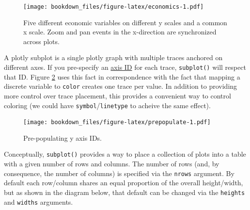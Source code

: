 \documentclass[12pt,]{isuthesis}
\newenvironment{Shaded}{\begin{snugshade}}{\end{snugshade}}
\newcommand{\KeywordTok}[1]{\textcolor[rgb]{0.13,0.29,0.53}{\textbf{{#1}}}}
\newcommand{\DataTypeTok}[1]{\textcolor[rgb]{0.13,0.29,0.53}{{#1}}}
\newcommand{\DecValTok}[1]{\textcolor[rgb]{0.00,0.00,0.81}{{#1}}}
\newcommand{\StringTok}[1]{\textcolor[rgb]{0.31,0.60,0.02}{{#1}}}
\newcommand{\OtherTok}[1]{\textcolor[rgb]{0.56,0.35,0.01}{{#1}}}
\newcommand{\NormalTok}[1]{{#1}}
\begin{document}
\begin{figure}[htbp]
\centering
\texttt{[image: bookdown\_files/figure-latex/economics-1.pdf]}
\caption{\label{fig:economics}Five different economic variables on different
y scales and a common x scale. Zoom and pan events in the x-direction
are synchronized across plots.}
\end{figure}

A plotly subplot is a single plotly graph with multiple traces anchored
on different axes. If you pre-specify an
\href{https://plot.ly/r/reference/\#scatter-yaxis}{axis ID} for each
trace, \texttt{subplot()} will respect that ID. Figure
\ref{fig:prepopulate} uses this fact in correspondence with the fact
that mapping a discrete variable to \texttt{color} creates one trace per
value. In addition to providing more control over trace placement, this
provides a convenient way to control coloring (we could have
\texttt{symbol}/\texttt{linetype} to acheive the same effect).

\begin{Shaded}
\end{Shaded}

\begin{figure}[htbp]
\centering
\texttt{[image: bookdown\_files/figure-latex/prepopulate-1.pdf]}
\caption{\label{fig:prepopulate}Pre-populating y axis IDs.}
\end{figure}

Conceptually, \texttt{subplot()} provides a way to place a collection of
plots into a table with a given number of rows and columns. The number
of rows (and, by consequence, the number of columns) is specified via
the \texttt{nrows} argument. By default each row/column shares an equal
proportion of the overall height/width, but as shown in the diagram
below, that default can be changed via the \texttt{heights} and
\texttt{widths} arguments.
\end{document}

